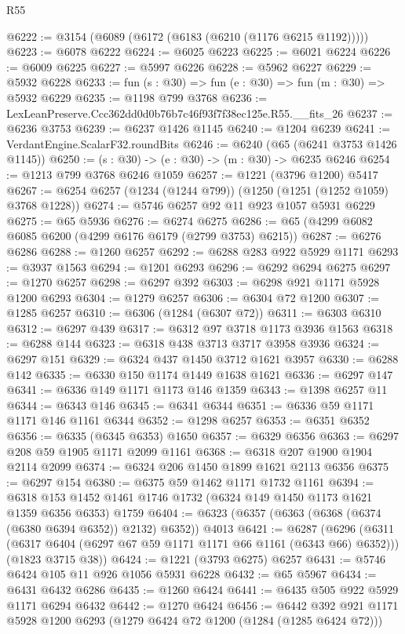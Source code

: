 \begin{lexlean}{R55}
\begin{coremodule}
@6222 := @3154 (@6089 (@6172 (@6183 (@6210 (@1176 @6215 @1192)))))
@6223 := @6078 @6222
@6224 := @6025 @6223
@6225 := @6021 @6224
@6226 := @6009 @6225
@6227 := @5997 @6226
@6228 := @5962 @6227
@6229 := @5932 @6228
@6233 := fun (s : @30) => fun (e : @30) => fun (m : @30) => @5932 @6229
@6235 := @1198 @799 @3768
@6236 := LexLeanPreserve.Ccc362dd0d0b76b7c46f93f7f38ec125e.R55.__fits_26
@6237 := @6236 @3753
@6239 := @6237 @1426 @1145
@6240 := @1204 @6239
@6241 := VerdantEngine.ScalarF32.roundBits
@6246 := @6240 (@65 (@6241 @3753 @1426 @1145))
@6250 := (s : @30) -> (e : @30) -> (m : @30) -> @6235 @6246
@6254 := @1213 @799 @3768 @6246 @1059
@6257 := @1221 (@3796 @1200) @5417
@6267 := @6254 @6257 (@1234 (@1244 @799)) (@1250 (@1251 (@1252 @1059) @3768 @1228))
@6274 := @5746 @6257 @92 @11 @923 @1057 @5931 @6229
@6275 := @65 @5936
@6276 := @6274 @6275
@6286 := @65 (@4299 @6082 @6085 @6200 (@4299 @6176 @6179 (@2799 @3753) @6215))
@6287 := @6276 @6286
@6288 := @1260 @6257
@6292 := @6288 @283 @922 @5929 @1171
@6293 := @3937 @1563
@6294 := @1201 @6293
@6296 := @6292 @6294 @6275
@6297 := @1270 @6257
@6298 := @6297 @392
@6303 := @6298 @921 @1171 @5928 @1200 @6293
@6304 := @1279 @6257
@6306 := @6304 @72 @1200
@6307 := @1285 @6257
@6310 := @6306 (@1284 (@6307 @72))
@6311 := @6303 @6310
@6312 := @6297 @439
@6317 := @6312 @97 @3718 @1173 @3936 @1563
@6318 := @6288 @144
@6323 := @6318 @438 @3713 @3717 @3958 @3936
@6324 := @6297 @151
@6329 := @6324 @437 @1450 @3712 @1621 @3957
@6330 := @6288 @142
@6335 := @6330 @150 @1174 @1449 @1638 @1621
@6336 := @6297 @147
@6341 := @6336 @149 @1171 @1173 @146 @1359
@6343 := @1398 @6257 @11
@6344 := @6343 @146
@6345 := @6341 @6344
@6351 := @6336 @59 @1171 @1171 @146 @1161 @6344
@6352 := @1298 @6257
@6353 := @6351 @6352
@6356 := @6335 (@6345 @6353) @1650
@6357 := @6329 @6356
@6363 := @6297 @208 @59 @1905 @1171 @2099 @1161
@6368 := @6318 @207 @1900 @1904 @2114 @2099
@6374 := @6324 @206 @1450 @1899 @1621 @2113 @6356
@6375 := @6297 @154
@6380 := @6375 @59 @1462 @1171 @1732 @1161
@6394 := @6318 @153 @1452 @1461 @1746 @1732 (@6324 @149 @1450 @1173 @1621 @1359 @6356 @6353) @1759
@6404 := @6323 (@6357 (@6363 (@6368 (@6374 (@6380 @6394 @6352)) @2132) @6352)) @4013
@6421 := @6287
    (@6296
      (@6311 (@6317 @6404 (@6297 @67 @59 @1171 @1171 @66 @1161 (@6343 @66) @6352)))
      (@1823 @3715 @38))
@6424 := @1221 (@3793 @6275) @6257
@6431 := @5746 @6424 @105 @11 @926 @1056 @5931 @6228
@6432 := @65 @5967
@6434 := @6431 @6432 @6286
@6435 := @1260 @6424
@6441 := @6435 @505 @922 @5929 @1171 @6294 @6432
@6442 := @1270 @6424
@6456 := @6442 @392 @921 @1171 @5928 @1200 @6293 (@1279 @6424 @72 @1200 (@1284 (@1285 @6424 @72)))

\end{coremodule}
\end{lexlean}
